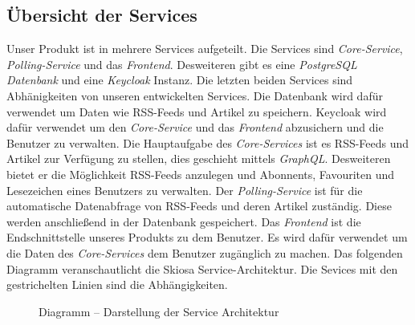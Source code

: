 \subsection{Übersicht der Services}
Unser Produkt ist in mehrere Services aufgeteilt. Die Services sind \textit{Core-Service}, \textit{Polling-Service} und das \textit{Frontend}.
Desweiteren gibt es eine \textit{PostgreSQL Datenbank} und eine \textit{Keycloak} Instanz. Die letzten beiden Services sind Abhänigkeiten von unseren entwickelten Services.
Die Datenbank wird dafür verwendet um Daten wie RSS-Feeds und Artikel zu speichern.
Keycloak wird dafür verwendet um den \textit{Core-Service} und das \textit{Frontend} abzusichern und die Benutzer zu verwalten.
Die Hauptaufgabe des \textit{Core-Services} ist es RSS-Feeds und Artikel zur Verfügung zu stellen, dies geschieht mittels \textit{GraphQL}. Desweiteren bietet er die Möglichkeit
RSS-Feeds anzulegen und Abonnents, Favouriten und Lesezeichen eines Benutzers zu verwalten.
Der \textit{Polling-Service} ist für die automatische Datenabfrage von RSS-Feeds und deren Artikel zuständig. Diese werden anschließend in der Datenbank gespeichert.
Das \textit{Frontend} ist die Endschnittstelle unseres Produkts zu dem Benutzer.
Es wird dafür verwendet um die Daten des \textit{Core-Services} dem Benutzer zugänglich zu machen.
Das folgenden Diagramm veranschautlicht die Skiosa Service-Architektur. Die Sevices mit den gestrichelten Linien sind die Abhängigkeiten.
\begin{figure}[!htbp]
    \centering    
    \usetikzlibrary{positioning}
\caption{Diagramm – Darstellung der Service Architektur}
\end{figure}

